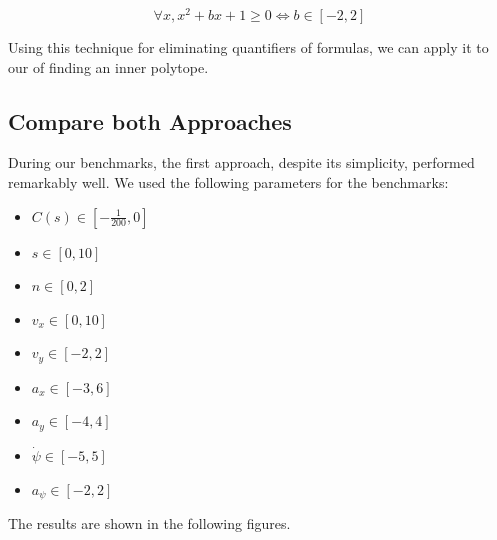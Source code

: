\[
	\forall x, x^2 + bx + 1 \geq 0 \iff b \in [-2, 2]
\]

Using this technique for eliminating quantifiers of formulas, we can apply it to our of finding an inner polytope.

\subsection{Compare both Approaches}

During our benchmarks, the first approach, despite its simplicity, performed remarkably well.
We used the following parameters for the benchmarks:
\begin{itemize}
	\item $C(s) \in \left[-\frac{1}{200}, 0\right]$
	\item $s \in [0, 10]$
	\item $n \in [0, 2]$
	\item $v_x \in [0, 10]$
	\item $v_y \in [-2, 2]$
	\item $a_x \in [-3, 6]$
	\item $a_y \in [-4, 4]$
	\item $\dot{\psi} \in [-5, 5]$
	\item $a_\psi \in [-2, 2]$
\end{itemize}

The results are shown in the following figures.

